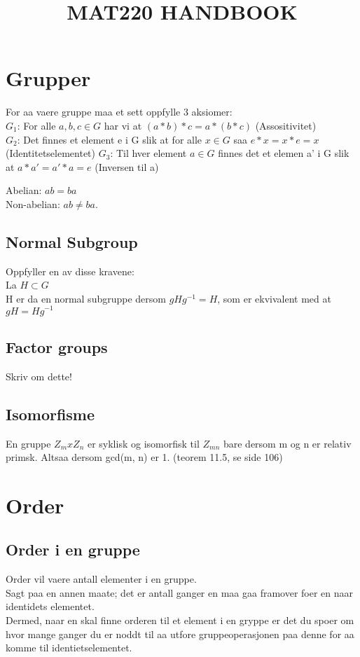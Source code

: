 \documentclass[12pt,a4paper]{article}
\title{MAT220 HANDBOOK}
\begin{document}
%

\maketitle

\section*{Grupper}
For aa vaere gruppe maa et sett oppfylle 3 aksiomer:\\
$G_1$: For alle $a,b,c \in G$ har vi at $(a*b)*c = a*(b*c)$ (Assositivitet)\\
$G_2$: Det finnes et element e i G slik at for alle $x \in G$ saa $e*x = x*e = x$ (Identitetselementet)
$G_3$: Til hver element $a \in G$ finnes det et elemen a' i G slik at $a*a' = a'*a = e$ (Inversen til a)

Abelian: $ab = ba$\\
Non-abelian: $ab \neq ba$.

\subsection*{Normal Subgroup}
Oppfyller en av disse kravene:\\
La $H \subset G$\\
H er da en normal subgruppe dersom $gHg^{-1} = H$, som er ekvivalent med at\\
$gH = Hg^{-1}$

\subsection*{Factor groups}
Skriv om dette!

\subsection*{Isomorfisme}
En gruppe $ Z_{m} x Z_{n} $ er syklisk og isomorfisk til $ Z_{mn} $ bare dersom m og n er relativ primsk.
Altsaa dersom gcd(m, n) er 1. (teorem 11.5, se side 106)

\section*{Order}
\subsection*{Order i en gruppe}
Order vil vaere antall elementer i en gruppe.\\
Sagt paa en annen maate; det er antall ganger en maa gaa framover foer en naar identidets elementet. \\
Dermed, naar en skal finne orderen til et element i en gryppe er det du spoer om hvor mange ganger du er noddt til aa utfore gruppeoperasjonen paa denne for aa komme til identietselementet.
\end{document}
